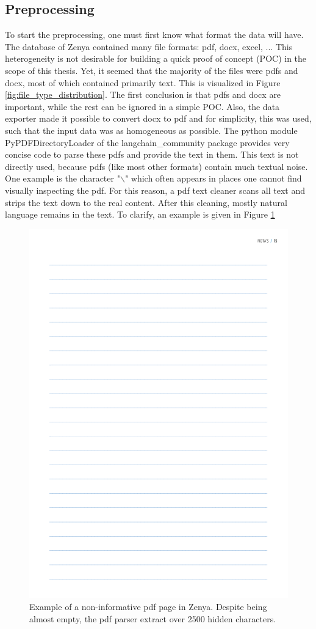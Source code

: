 \subsection{Preprocessing}
To start the preprocessing, one must first know what format the data will have. The database of Zenya contained many file formats: pdf, docx, excel, ... This heterogeneity is not desirable for building a quick proof of concept (POC) in the scope of this thesis. Yet, it seemed that the majority of the files were pdfs and docx, most of which contained primarily text. This is visualized in Figure \ref{fig:file_type_distribution}. The first conclusion is that pdfs and docx are important, while the rest can be ignored in a simple POC. Also, the data exporter made it possible to convert docx to pdf and for simplicity, this was used, such that the input data was as homogeneous as possible. The python module PyPDFDirectoryLoader of the langchain\_community package  provides very concise code to parse these pdfs and provide the text in them. This text is not directly used, because pdfs (like most other formats) contain much textual noise. One example is the character "$\backslash$" which often appears in places one cannot find visually inspecting the pdf. For this reason, a pdf text cleaner scans all text and strips the text down to the real content. After this cleaning, mostly natural language remains in the text. To clarify, an example is given in Figure \ref{fig:pdf_clutter}

\begin{figure}[H]
    \centerline{\includegraphics[width=0.5\linewidth]{fig/pdf_clutter.png}}
    \caption{Example of a non-informative pdf page in Zenya. Despite being almost empty, the pdf parser extract over 2500 hidden characters.}
    \label{fig:pdf_clutter}
\end{figure}


